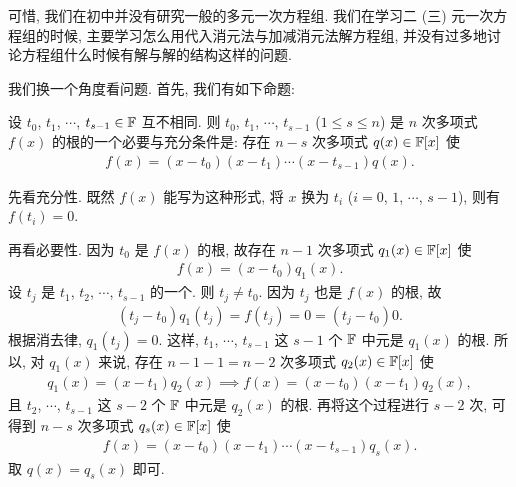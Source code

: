 可惜, 我们在初中并没有研究一般的多元一次方程组. 我们在学习二 (三) 元一次方程组的时候, 主要学习怎么用代入消元法与加减消元法解方程组, 并没有过多地讨论方程组什么时候有解与解的结构这样的问题.

我们换一个角度看问题. 首先, 我们有如下命题:

\begin{proposition}
    设 $t_0$, $t_1$, $\cdots$, $t_{s-1} \in \mathbb{F}$ 互不相同. 则 $t_0$, $t_1$, $\cdots$, $t_{s-1}$ ($1 \leq s \leq n$) 是 $n$ 次多项式 $f(x)$ 的根的一个必要与充分条件是: 存在 $n-s$ 次多项式 $q(x) \in \mathbb{F}[x]$ 使
    \begin{align*}
        f(x) = (x - t_0)(x - t_1) \cdots (x-t_{s-1}) q(x).
    \end{align*}
\end{proposition}

\begin{pf}
    先看充分性. 既然 $f(x)$ 能写为这种形式, 将 $x$ 换为 $t_i$ ($i = 0$, $1$, $\cdots$, $s-1$), 则有 $f(t_i) = 0$.

    再看必要性. 因为 $t_0$ 是 $f(x)$ 的根, 故存在 $n-1$ 次多项式 $q_1 (x) \in \mathbb{F}[x]$ 使
    \begin{align*}
        f(x) = (x - t_0) q_1 (x).
    \end{align*}
    设 $t_j$ 是 $t_1$, $t_2$, $\cdots$, $t_{s-1}$ 的一个. 则 $t_j \neq t_0$. 因为 $t_j$ 也是 $f(x)$ 的根, 故
    \begin{align*}
        (t_j - t_0) q_1 (t_j) = f(t_j) = 0 = (t_j - t_0) 0.
    \end{align*}
    根据消去律, $q_1 (t_j) = 0$. 这样, $t_1$, $\cdots$, $t_{s-1}$ 这 $s-1$ 个 $\mathbb{F}$ 中元是 $q_1 (x)$ 的根. 所以, 对 $q_1 (x)$ 来说, 存在 $n-1-1 = n-2$ 次多项式 $q_2 (x) \in \mathbb{F}[x]$ 使
    \begin{align*}
        q_1 (x) = (x - t_1) q_2 (x) \implies f(x) = (x - t_0) (x - t_1) q_2 (x),
    \end{align*}
    且 $t_2$, $\cdots$, $t_{s-1}$ 这 $s-2$ 个 $\mathbb{F}$ 中元是 $q_2 (x)$ 的根. 再将这个过程进行 $s-2$ 次, 可得到 $n-s$ 次多项式 $q_s (x) \in \mathbb{F}[x]$ 使
    \begin{align*}
        f(x) = (x - t_0) (x - t_1) \cdots (x - t_{s-1}) q_s (x).
    \end{align*}
    取 $q(x) = q_s (x)$ 即可.
\end{pf}

